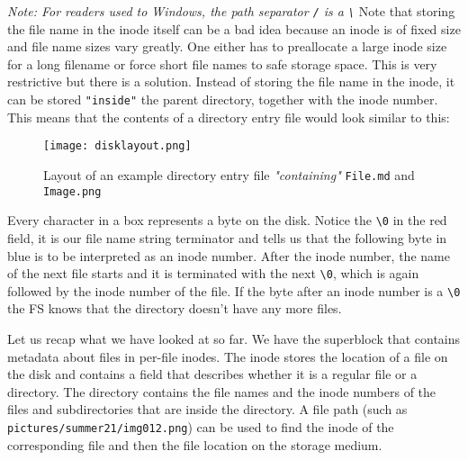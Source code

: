\textit{Note: For readers used to Windows, the path separator \texttt{/} is a \texttt{\textbackslash}}
Note that storing the file name in the inode itself can be a
bad idea because an inode is of fixed size and file name sizes vary greatly. One either has to preallocate a large inode size for a long filename
or force short file names to safe storage space. This is very restrictive but there is a solution.
Instead of storing the file name in the inode, it can be stored \texttt{"inside"} the parent directory,
together with the inode number. This means that the contents of a directory entry file would look similar 
to this:

\begin{figure}[h]
	\texttt{[image: disklayout.png]}
	\caption{Layout of an example directory entry file \textit{"containing"} \texttt{File.md} and \texttt{Image.png}}
	\centering
\end{figure}

Every character in a box represents a byte on the disk. Notice the \texttt{\textbackslash 0} in the red field,
it is our file name string terminator and tells us that the following byte in blue is to be interpreted
as an inode number. After the inode number, the name of the next file starts and it is terminated with the next \texttt{\textbackslash 0}, which is again
followed by the inode number of the file. If the byte after an inode number is a \texttt{\textbackslash 0} the FS knows
that the directory doesn't have any more files.

Let us recap what we have looked at so far.
We have the superblock that contains metadata about files in per-file inodes. The inode stores the
location of a file on the disk and contains a field that describes whether it is a regular file or a
directory. The directory contains the file names and the inode numbers of the files and subdirectories
that are inside the directory. A file path (such as \texttt{pictures/summer21/img012.png}) can
be used to find the inode of the corresponding file and then the file location on the storage medium.

